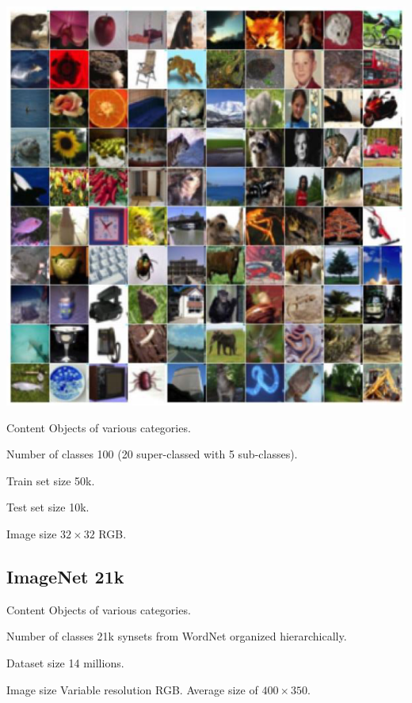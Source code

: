 \begin{minipage}{0.45\linewidth}
    \centering
    \includegraphics[width=0.7\linewidth]{./img/cifar100.png}
\end{minipage}
\begin{minipage}{0.5\linewidth}
    \begin{descriptionlist}
        \item[Content] Objects of various categories.
        \item[Number of classes] 100 (20 super-classed with 5 sub-classes).
        \item[Train set size] 50k.
        \item[Test set size] 10k.
        \item[Image size] $32 \times 32$ RGB.
    \end{descriptionlist}
\end{minipage}


\subsection{ImageNet 21k}

\begin{descriptionlist}
    \item[Content] Objects of various categories.
    \item[Number of classes] 21k synsets from WordNet organized hierarchically.
    \item[Dataset size] 14 millions.
    \item[Image size] Variable resolution RGB. Average size of $400 \times 350$.
\end{descriptionlist}

